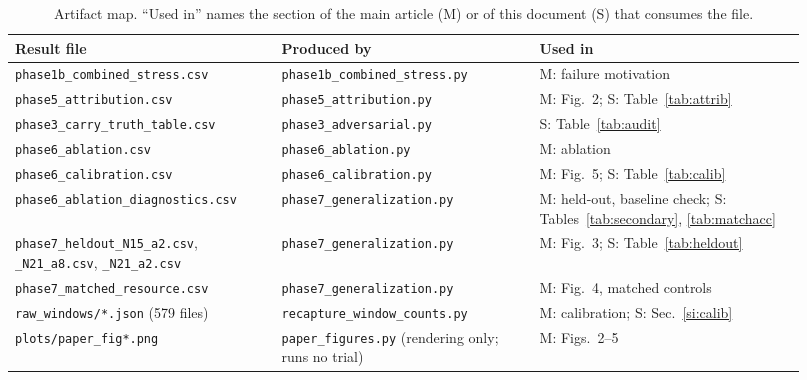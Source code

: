 \documentclass[preprint,11pt]{elsarticle}
\begin{document}
\begin{table}[h]
\centering\small
\caption{Artifact map. ``Used in'' names the section of the main article
(M) or of this document (S) that consumes the file.}
\label{tab:artifacts}
\scriptsize
\begin{tabular}{@{}>{\raggedright\arraybackslash}p{0.31\linewidth}>{\raggedright\arraybackslash}p{0.30\linewidth}>{\raggedright\arraybackslash}p{0.31\linewidth}@{}}
\toprule
Result file & Produced by & Used in \\
\midrule
\texttt{phase1b\_\allowbreak{}combined\_\allowbreak{}stress.csv} & \texttt{phase1b\_\allowbreak{}combined\_\allowbreak{}stress.py} & M: failure motivation \\
\texttt{phase5\_\allowbreak{}attribution.csv} & \texttt{phase5\_\allowbreak{}attribution.py} & M: Fig.~2; S: Table~\ref{tab:attrib} \\
\texttt{phase3\_\allowbreak{}carry\_\allowbreak{}truth\_\allowbreak{}table.csv} & \texttt{phase3\_\allowbreak{}adversarial.py} & S: Table~\ref{tab:audit} \\
\texttt{phase6\_\allowbreak{}ablation.csv} & \texttt{phase6\_\allowbreak{}ablation.py} & M: ablation \\
\texttt{phase6\_\allowbreak{}calibration.csv} & \texttt{phase6\_\allowbreak{}calibration.py} & M: Fig.~5; S: Table~\ref{tab:calib} \\
\texttt{phase6\_\allowbreak{}ablation\_\allowbreak{}diagnostics.csv} & \texttt{phase7\_\allowbreak{}generalization.py} & M: held-out, baseline check; S: Tables~\ref{tab:secondary}, \ref{tab:matchacc} \\
\texttt{phase7\_\allowbreak{}heldout\_\allowbreak{}N15\_\allowbreak{}a2.csv}, \texttt{\_\allowbreak{}N21\_\allowbreak{}a8.csv}, \texttt{\_\allowbreak{}N21\_\allowbreak{}a2.csv} & \texttt{phase7\_\allowbreak{}generalization.py} & M: Fig.~3; S: Table~\ref{tab:heldout} \\
\texttt{phase7\_\allowbreak{}matched\_\allowbreak{}resource.csv} & \texttt{phase7\_\allowbreak{}generalization.py} & M: Fig.~4, matched controls \\
\texttt{raw\_\allowbreak{}windows/*.json} (579 files) & \texttt{recapture\_\allowbreak{}window\_\allowbreak{}counts.py} & M: calibration; S: Sec.~\ref{si:calib} \\
\midrule
\texttt{plots/paper\_\allowbreak{}fig*.png} & \texttt{paper\_\allowbreak{}figures.py} (rendering only; runs no trial) & M: Figs.~2--5 \\
\bottomrule
\end{tabular}
\end{table}
\end{document}
